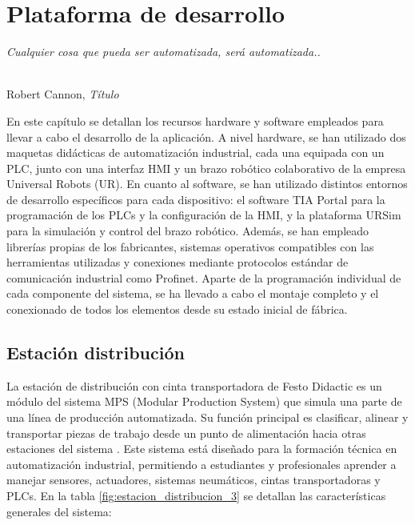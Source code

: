 \chapter{Plataforma de desarrollo}
\label{cap:capitulo3}

\begin{flushright}
\begin{minipage}[]{10cm}
\emph{Cualquier cosa que pueda ser automatizada, será automatizada..}\\
\end{minipage}\\

Robert Cannon, \textit{Título}\\
\end{flushright}

\vspace{1cm}

En este capítulo se detallan los recursos hardware y software empleados para llevar a cabo el desarrollo de la aplicación. A nivel hardware, se han utilizado dos maquetas didácticas de automatización industrial, cada una equipada con un PLC, junto con una interfaz HMI y un brazo robótico colaborativo de la empresa Universal Robots (UR). En cuanto al software, se han utilizado distintos entornos de desarrollo específicos para cada dispositivo: el software TIA Portal para la programación de los PLCs y la configuración de la HMI, y la plataforma URSim para la simulación y control del brazo robótico. Además, se han empleado librerías propias de los fabricantes, sistemas operativos compatibles con las herramientas utilizadas y conexiones mediante protocolos estándar de comunicación industrial como Profinet. Aparte de la programación individual de cada componente del sistema, se ha llevado a cabo el montaje completo y el conexionado de todos los elementos desde su estado inicial de fábrica.

\section{Estación distribución}

La estación de distribución con cinta transportadora de Festo Didactic es un módulo del sistema MPS (Modular Production System) que simula una parte de una línea de producción automatizada. Su función principal es clasificar, alinear y transportar piezas de trabajo desde un punto de alimentación hacia otras estaciones del sistema \cite{estacion_distribucion}. Este sistema está diseñado para la formación técnica en automatización industrial, permitiendo a estudiantes y profesionales aprender a manejar sensores, actuadores, sistemas neumáticos, cintas transportadoras y PLCs. En la tabla \ref{fig:estacion_distribucion_3} se detallan las características generales del sistema: \\

